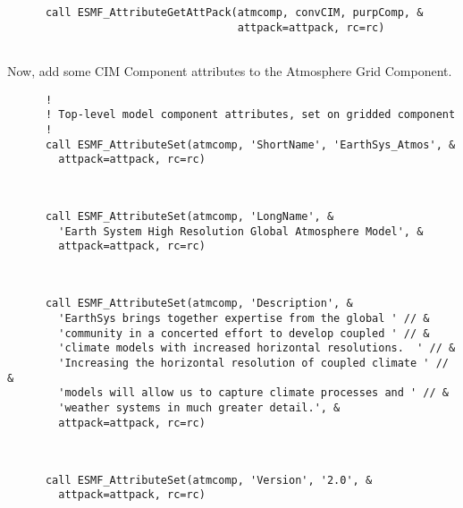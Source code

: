  \begin{verbatim}
      call ESMF_AttributeGetAttPack(atmcomp, convCIM, purpComp, &
                                    attpack=attpack, rc=rc)
 
\end{verbatim}
 

  \begin{sloppypar}
       Now, add some CIM Component attributes to the Atmosphere Grid Component.
  \end{sloppypar} 

 \begin{verbatim}
      !
      ! Top-level model component attributes, set on gridded component
      !
      call ESMF_AttributeSet(atmcomp, 'ShortName', 'EarthSys_Atmos', &
        attpack=attpack, rc=rc)
 
\end{verbatim}
 

 \begin{verbatim}

      call ESMF_AttributeSet(atmcomp, 'LongName', &
        'Earth System High Resolution Global Atmosphere Model', &
        attpack=attpack, rc=rc)
 
\end{verbatim}
 

 \begin{verbatim}

      call ESMF_AttributeSet(atmcomp, 'Description', &
        'EarthSys brings together expertise from the global ' // &
        'community in a concerted effort to develop coupled ' // &
        'climate models with increased horizontal resolutions.  ' // &
        'Increasing the horizontal resolution of coupled climate ' // &
        'models will allow us to capture climate processes and ' // &
        'weather systems in much greater detail.', &
        attpack=attpack, rc=rc)
 
\end{verbatim}
 

 \begin{verbatim}

      call ESMF_AttributeSet(atmcomp, 'Version', '2.0', &
        attpack=attpack, rc=rc)
 
\end{verbatim}
 
